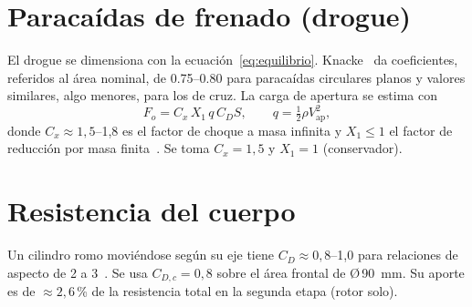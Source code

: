 \section{Paracaídas de frenado (drogue)}\label{sec:teoria-drogue}
El drogue se dimensiona con la ecuación~\eqref{eq:equilibrio}. Knacke~\cite{knacke1992}
da coeficientes, referidos al área nominal, de \numrange{0.75}{0.80} para paracaídas
circulares planos y valores similares, algo menores, para los de cruz. La carga de apertura
se estima con
\begin{equation}
  F_o = C_x\, X_1\, q\, C_D S, \qquad q=\tfrac12\rho V_{\text{ap}}^2 ,
  \label{eq:apertura}
\end{equation}
donde $C_x\approx1{,}5$--1,8 es el factor de choque a masa infinita y $X_1\le1$ el factor
de reducción por masa finita~\cite{knacke1992}. Se toma $C_x=1{,}5$ y $X_1=1$
(conservador).

\section{Resistencia del cuerpo}
Un cilindro romo moviéndose según su eje tiene $C_D\approx0{,}8$--1,0 para relaciones de
aspecto de 2 a 3~\cite{hoerner1965}. Se usa $C_{D,c}=0{,}8$ sobre el área frontal de
Ø\,\SI{90}{mm}. Su aporte es de $\approx2{,}6$\,\% de la resistencia total en la segunda etapa (rotor solo).
